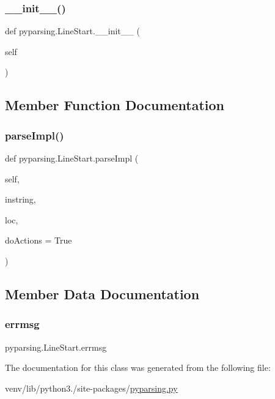 \subsubsection{\texorpdfstring{\+\_\+\+\_\+init\+\_\+\+\_\+()}{\_\_init\_\_()}}
{\footnotesize\ttfamily def pyparsing.\+Line\+Start.\+\_\+\+\_\+init\+\_\+\+\_\+ (\begin{DoxyParamCaption}\item[{}]{self }\end{DoxyParamCaption})}



\subsection{Member Function Documentation}
\mbox{\label{classpyparsing_1_1LineStart_a1e8a545cab426bcccb399f5510fe20bb}} 
\subsubsection{\texorpdfstring{parse\+Impl()}{parseImpl()}}
{\footnotesize\ttfamily def pyparsing.\+Line\+Start.\+parse\+Impl (\begin{DoxyParamCaption}\item[{}]{self,  }\item[{}]{instring,  }\item[{}]{loc,  }\item[{}]{do\+Actions = {\ttfamily True} }\end{DoxyParamCaption})}



\subsection{Member Data Documentation}
\mbox{\label{classpyparsing_1_1LineStart_aa3c49340e63e1f7db1c8f3a4e61e382e}} 
\subsubsection{\texorpdfstring{errmsg}{errmsg}}
{\footnotesize\ttfamily pyparsing.\+Line\+Start.\+errmsg}



The documentation for this class was generated from the following file\+:\begin{DoxyCompactItemize}
\item 
venv/lib/python3./site-\/packages/\hyperlink{pyparsing_8py}{pyparsing.\+py}\end{DoxyCompactItemize}
